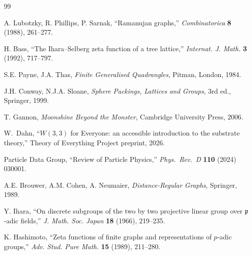 \documentclass[12pt,a4paper]{amsart}
\theoremstyle{plain}
\theoremstyle{definition}
\theoremstyle{remark}
\begin{document}
\begin{thebibliography}{99}

  A. Lubotzky, R. Phillips, P. Sarnak,
  ``Ramanujan graphs,'' \textit{Combinatorica} \textbf{8} (1988), 261--277.

  H. Bass, ``The Ihara--Selberg zeta function of a tree lattice,''
  \textit{Internat. J. Math.} \textbf{3} (1992), 717--797.

  S.E. Payne, J.A. Thas, \textit{Finite Generalised Quadrangles},
  Pitman, London, 1984.

  J.H. Conway, N.J.A. Sloane, \textit{Sphere Packings, Lattices and Groups},
  3rd ed., Springer, 1999.

  T. Gannon, \textit{Moonshine Beyond the Monster},
  Cambridge University Press, 2006.

  W.~Dahn, ``$W(3,3)$ for Everyone: an accessible introduction
  to the substrate theory,'' Theory of Everything Project preprint, 2026.

  Particle Data Group, ``Review of Particle Physics,'' \textit{Phys.~Rev.~D}
  \textbf{110} (2024) 030001.

  A.E. Brouwer, A.M. Cohen, A. Neumaier,
  \textit{Distance-Regular Graphs}, Springer, 1989.

  Y. Ihara, ``On discrete subgroups of the two by two projective linear
  group over $\mathfrak{p}$-adic fields,'' \textit{J. Math. Soc. Japan}
  \textbf{18} (1966), 219--235.

  K. Hashimoto, ``Zeta functions of finite graphs and representations of
  $p$-adic groups,'' \textit{Adv. Stud. Pure Math.} \textbf{15} (1989), 211--280.

\end{thebibliography}
\end{document}
